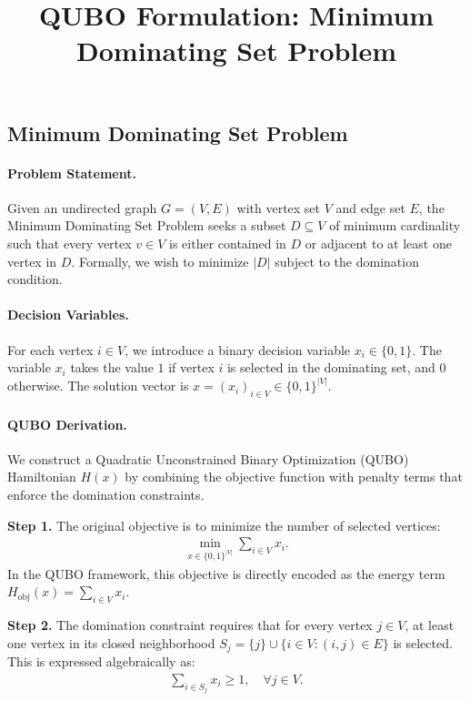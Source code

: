 \documentclass[12pt]{article}
\title{QUBO Formulation: Minimum Dominating Set Problem}
\date{}
\begin{document}
\maketitle

\subsection*{Minimum Dominating Set Problem}

\paragraph{Problem Statement.}
Given an undirected graph $G=(V,E)$ with vertex set $V$ and edge set $E$, the Minimum Dominating Set Problem seeks a subset $D \subseteq V$ of minimum cardinality such that every vertex $v \in V$ is either contained in $D$ or adjacent to at least one vertex in $D$. Formally, we wish to minimize $|D|$ subject to the domination condition.

\paragraph{Decision Variables.}
For each vertex $i \in V$, we introduce a binary decision variable $x_i \in \{0,1\}$. The variable $x_i$ takes the value $1$ if vertex $i$ is selected in the dominating set, and $0$ otherwise. The solution vector is $x = (x_i)_{i \in V} \in \{0,1\}^{|V|}$.

\paragraph{QUBO Derivation.}
We construct a Quadratic Unconstrained Binary Optimization (QUBO) Hamiltonian $H(x)$ by combining the objective function with penalty terms that enforce the domination constraints.

\textbf{Step 1.} The original objective is to minimize the number of selected vertices:
\begin{align}
    \min_{x \in \{0,1\}^{|V|}} \sum_{i \in V} x_i.
\end{align}
In the QUBO framework, this objective is directly encoded as the energy term $H_{\text{obj}}(x) = \sum_{i \in V} x_i$.

\textbf{Step 2.} The domination constraint requires that for every vertex $j \in V$, at least one vertex in its closed neighborhood $S_j = \{j\} \cup \{i \in V : (i,j) \in E\}$ is selected. This is expressed algebraically as:
\begin{align}
    \sum_{i \in S_j} x_i \ge 1, \quad \forall j \in V.
\end{align}
\end{document}
